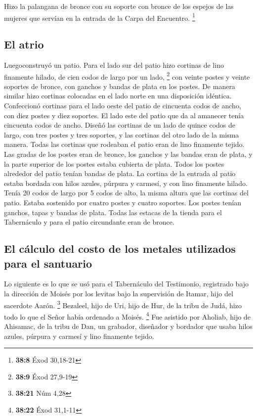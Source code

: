  Hizo la palangana de bronce con su soporte con bronce de
los espejos de las mujeres que servían en la entrada de la Carpa del
Encuentro. \footnote{\textbf{38:8} Éxod 30,18-21}

\hypertarget{el-atrio}{%
\subsection{El atrio}\label{el-atrio}}

 Luegoconstruyó un patio. Para el lado sur del patio hizo
cortinas de lino finamente hilado, de cien codos de largo por un lado,
\footnote{\textbf{38:9} Éxod 27,9-19}  con veinte postes
y veinte soportes de bronce, con ganchos y bandas de plata en los
postes.  De manera similar hizo cortinas colocadas en el
lado norte en una disposición idéntica.  Confeccionó
cortinas para el lado oeste del patio de cincuenta codos de ancho, con
diez postes y diez soportes.  El lado este del patio que
da al amanecer tenía cincuenta codos de ancho.  Diseñó
las cortinas de un lado de quince codos de largo, con tres postes y tres
soportes,  y las cortinas del otro lado de la misma
manera.  Todas las cortinas que rodeaban el patio eran de
lino finamente tejido.  Las gradas de los postes eran de
bronce, los ganchos y las bandas eran de plata, y la parte superior de
los postes estaba cubierta de plata. Todos los postes alrededor del
patio tenían bandas de plata.  La cortina de la entrada
al patio estaba bordada con hilos azules, púrpura y carmesí, y con lino
finamente hilado. Tenía 20 codos de largo por 5 codos de alto, la misma
altura que las cortinas del patio.  Estaba sostenido por
cuatro postes y cuatro soportes. Los postes tenían ganchos, tapas y
bandas de plata.  Todas las estacas de la tienda para el
Tabernáculo y para el patio circundante eran de bronce.

\hypertarget{el-cuxe1lculo-del-costo-de-los-metales-utilizados-para-el-santuario}{%
\subsection{El cálculo del costo de los metales utilizados para el
santuario}\label{el-cuxe1lculo-del-costo-de-los-metales-utilizados-para-el-santuario}}

 Lo siguiente es lo que se usó para el Tabernáculo del
Testimonio, registrado bajo la dirección de Moisés por los levitas bajo
la supervisión de Itamar, hijo del sacerdote Aarón. \footnote{\textbf{38:21}
  Núm 4,28}  Bezaleel, hijo de Uri, hijo de Hur, de la
tribu de Judá, hizo todo lo que el Señor había ordenado a Moisés.
\footnote{\textbf{38:22} Éxod 31,1-11}  Fue asistido por
Aholiab, hijo de Ahisamac, de la tribu de Dan, un grabador, diseñador y
bordador que usaba hilos azules, púrpura y carmesí y lino finamente
tejido.

